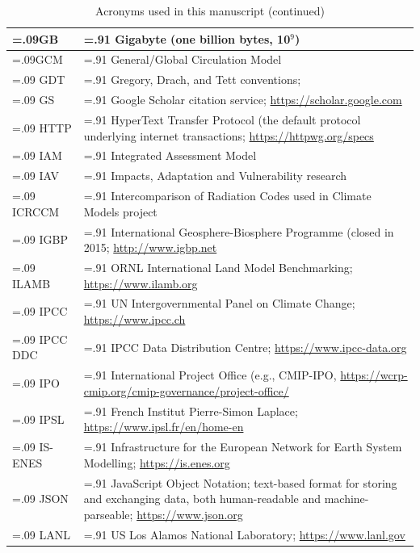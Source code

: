 \documentclass[manuscript]{copernicus}
\begin{document}
\addtocounter{table}{-1}
\begin{table}[htp]
\renewcommand{\arraystretch}{2}
\scriptsize
\centering
\caption{Acronyms used in this manuscript (continued)}
\resizebox{\textwidth}{!} {
	\begin{tabularx}{1\textwidth} { 
	  | >{\raggedright\arraybackslash\hsize=.09\hsize}X
	  | >{\centering\arraybackslash\hsize=.91\hsize}X | }
\hline
GB & Gigabyte (one billion bytes, 10$^{9}$)\\ \hline
GCM & General/Global Circulation Model\\ \hline
GDT & Gregory, Drach, and Tett conventions; \cite[see][]{gregory_gdt_1999}\\ \hline
GS & Google Scholar citation service; \url{https://scholar.google.com}\\ \hline
HTTP & HyperText Transfer Protocol (the default protocol underlying internet transactions; \url{https://httpwg.org/specs}\\ \hline
IAM & Integrated Assessment Model\\ \hline
IAV & Impacts, Adaptation and Vulnerability research\\ \hline
ICRCCM & Intercomparison of Radiation Codes used in Climate Models project\\ \hline
IGBP & International Geosphere-Biosphere Programme (closed in 2015; \url{http://www.igbp.net}\\ \hline
ILAMB & ORNL International Land Model Benchmarking; \url{https://www.ilamb.org}\\ \hline
IPCC & UN Intergovernmental Panel on Climate Change; \url{https://www.ipcc.ch}\\ \hline
IPCC DDC & IPCC Data Distribution Centre; \url{https://www.ipcc-data.org}\\ \hline
IPO & International Project Office (e.g., CMIP-IPO, \url{https://wcrp-cmip.org/cmip-governance/project-office/}\\ \hline
IPSL & French Institut Pierre-Simon Laplace; \url{https://www.ipsl.fr/en/home-en}\\ \hline
IS-ENES & Infrastructure for the European Network for Earth System Modelling; \url{https://is.enes.org}\\ \hline
JSON & JavaScript Object Notation; text-based format for storing and exchanging data, both human-readable and machine-parseable; \url{https://www.json.org}\\ \hline
LANL & US Los Alamos National Laboratory; \url{https://www.lanl.gov}\\ \hline

\end{tabularx}}
\end{table}
\end{document}
